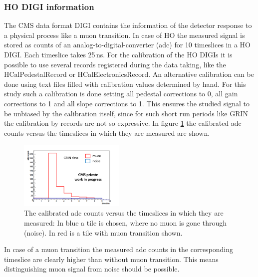 		\subsubsection{HO DIGI information}
			The CMS data format DIGI contains the information of the detector response to a physical process like a muon transition.
			In case of HO the measured signal is stored as counts of an analog-to-digital-converter (adc) for 10 timeslices in a HO DIGI.
			Each timeslice takes 25\,ns.
			For the calibration of the HO DIGIs it is possible to use several records registered during the data taking, like the HCalPedestalRecord or HCalElectronicsRecord.
			An alternative calibration can be done using text files filled with calibration values determined by hand.
			For this study such a calibration is done setting all pedestal corrections to 0, all gain corrections to 1 and all slope corrections to 1.
			This ensures the studied signal to be unbiased by the calibration itself, since for such short run periods like GRIN the calibration by records are not so expressive.
			In figure \ref{fig:adc_vs_ts} the calibrated adc counts versus the timeslices in which they are measured are shown.
			\begin{figure}[htbp]
				\centering
				\includegraphics[width=0.45\textwidth]{Figures/erdogan/adc_vs_ts.png}
				\caption{The calibrated adc counts versus the timeslices in which they are measured: In blue a tile is chosen, where no muon is gone through (noise). In red is a tile with muon transition shown.}
				\label{fig:adc_vs_ts}
			\end{figure}
			In case of a muon transition the measured adc counts in the corresponding timeslice are clearly higher than without muon transition.
			This means distinguishing muon signal from noise should be possible.
